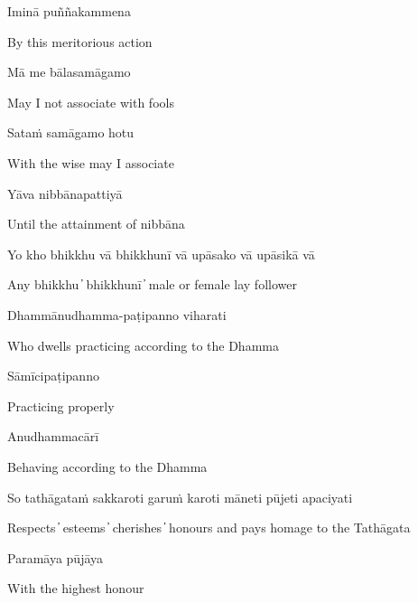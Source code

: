 Iminā puññakammena

\begin{cprenglish}
  By this meritorious action
\end{cprenglish}

Mā me bālasamāgamo

\begin{cprenglish}
  May I not associate with fools
\end{cprenglish}

Sataṁ samāgamo hotu

\begin{cprenglish}
  With the wise may I associate
\end{cprenglish}

Yāva nibbānapattiyā

\begin{cprenglish}
  Until the attainment of nibbāna
\end{cprenglish}


Yo kho bhikkhu vā bhikkhunī vā upāsako vā upāsikā vā

\begin{cprenglish}
  Any bhikkhu  ̓  bhikkhunī  ̓  male or female lay follower
\end{cprenglish}

Dhammānudhamma-paṭipanno viharati

\begin{cprenglish}
  Who dwells practicing according to the Dhamma
\end{cprenglish}

Sāmīcipaṭipanno

\begin{cprenglish}
  Practicing properly
\end{cprenglish}

Anudhammacārī

\begin{cprenglish}
  Behaving according to the Dhamma
\end{cprenglish}

So tathāgataṁ sakkaroti garuṁ karoti māneti pūjeti apaciyati

\begin{cprenglish}
  Respects  ̓  esteems  ̓  cherishes  ̓  honours and pays homage to the Tathāgata
\end{cprenglish}

Paramāya pūjāya

\begin{cprenglish}
  With the highest honour
\end{cprenglish}


